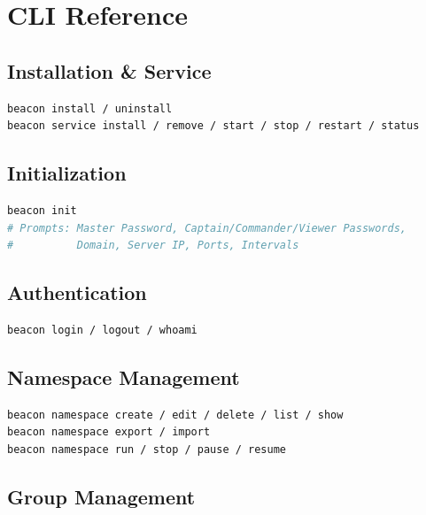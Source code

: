 \documentclass[12pt,a4paper]{article}
\begin{document}
\section{CLI Reference}

\subsection{Installation \& Service}

\begin{lstlisting}[language=bash]
beacon install / uninstall
beacon service install / remove / start / stop / restart / status
\end{lstlisting}

\subsection{Initialization}

\begin{lstlisting}[language=bash]
beacon init
# Prompts: Master Password, Captain/Commander/Viewer Passwords,
#          Domain, Server IP, Ports, Intervals
\end{lstlisting}

\subsection{Authentication}

\begin{lstlisting}[language=bash]
beacon login / logout / whoami
\end{lstlisting}

\subsection{Namespace Management}

\begin{lstlisting}[language=bash]
beacon namespace create / edit / delete / list / show
beacon namespace export / import
beacon namespace run / stop / pause / resume
\end{lstlisting}

\subsection{Group Management}
\end{document}
